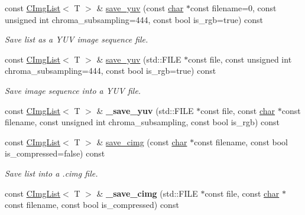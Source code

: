 \begin{DoxyCompactItemize}
const \hyperlink{structcimg__library__suffixed_1_1CImgList}{C\+Img\+List}$<$ T $>$ \& \hyperlink{structcimg__library__suffixed_1_1CImgList_a814df0230a293dc13c775ff885e7bfb2}{save\+\_\+yuv} (const \hyperlink{classchar}{char} $\ast$const filename=0, const unsigned int chroma\+\_\+subsampling=444, const bool is\+\_\+rgb=true) const
\begin{DoxyCompactList}\small\item\em Save list as a Y\+UV image sequence file. \end{DoxyCompactList}\item 
const \hyperlink{structcimg__library__suffixed_1_1CImgList}{C\+Img\+List}$<$ T $>$ \& \hyperlink{structcimg__library__suffixed_1_1CImgList_a728fccefa4127889e167607de5767ff4}{save\+\_\+yuv} (std\+::\+F\+I\+LE $\ast$const file, const unsigned int chroma\+\_\+subsampling=444, const bool is\+\_\+rgb=true) const
\begin{DoxyCompactList}\small\item\em Save image sequence into a Y\+UV file. \end{DoxyCompactList}\item 
\mbox{\label{structcimg__library__suffixed_1_1CImgList_afa25415a30608d507bc22bd6b85b5c1e}} 
const \hyperlink{structcimg__library__suffixed_1_1CImgList}{C\+Img\+List}$<$ T $>$ \& {\bfseries \+\_\+save\+\_\+yuv} (std\+::\+F\+I\+LE $\ast$const file, const \hyperlink{classchar}{char} $\ast$const filename, const unsigned int chroma\+\_\+subsampling, const bool is\+\_\+rgb) const
\item 
const \hyperlink{structcimg__library__suffixed_1_1CImgList}{C\+Img\+List}$<$ T $>$ \& \hyperlink{structcimg__library__suffixed_1_1CImgList_a3d34d49b4dd45bfea1192ee67dcb7e85}{save\+\_\+cimg} (const \hyperlink{classchar}{char} $\ast$const filename, const bool is\+\_\+compressed=false) const
\begin{DoxyCompactList}\small\item\em Save list into a .cimg file. \end{DoxyCompactList}\item 
\mbox{\label{structcimg__library__suffixed_1_1CImgList_af99c31c0d24c46734145e1910ca44323}} 
const \hyperlink{structcimg__library__suffixed_1_1CImgList}{C\+Img\+List}$<$ T $>$ \& {\bfseries \+\_\+save\+\_\+cimg} (std\+::\+F\+I\+LE $\ast$const file, const \hyperlink{classchar}{char} $\ast$const filename, const bool is\+\_\+compressed) const

\end{DoxyCompactItemize}
